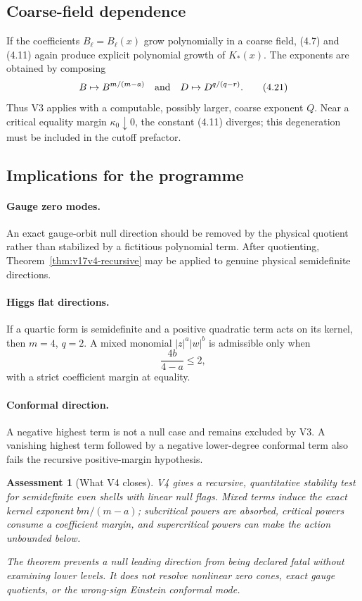 \documentclass[11pt]{article}
\newtheorem{assessment}[theorem]{Assessment}
\theoremstyle{remark}
\begin{document}
\subsection{Coarse-field dependence}

If the coefficients \(B_\ell=B_\ell(x)\) grow polynomially in a
coarse field, (4.7) and (4.11) again produce explicit polynomial
growth of \(K_*(x)\).  The exponents are obtained by composing
\[
 B\mapsto B^{m/(m-a)}
 \quad\hbox{and}\quad
 D\mapsto D^{q/(q-r)}.                              \tag{4.21}
\]
Thus V3 applies with a computable, possibly larger, coarse exponent
\(Q\).  Near a critical equality margin
\(\kappa_0\downarrow0\), the constant (4.11) diverges; this
degeneration must be included in the cutoff prefactor.

\subsection{Implications for the programme}

\paragraph{Gauge zero modes.}
An exact gauge-orbit null direction should be removed by the physical
quotient rather than stabilized by a fictitious polynomial term.
After quotienting, Theorem~\ref{thm:v17v4-recursive} may be applied
to genuine physical semidefinite directions.

\paragraph{Higgs flat directions.}
If a quartic form is semidefinite and a positive quadratic term acts
on its kernel, then \(m=4\), \(q=2\).  A mixed monomial
\(|z|^a|w|^b\) is admissible only when
\[
 \frac{4b}{4-a}\leq2,                               \tag{4.22}
\]
with a strict coefficient margin at equality.

\paragraph{Conformal direction.}
A negative highest term is not a null case and remains excluded by
V3.  A vanishing highest term followed by a negative lower-degree
conformal term also fails the recursive positive-margin hypothesis.

\begin{assessment}[What V4 closes]
\label{ass:v17v4-status}
V4 gives a recursive, quantitative stability test for semidefinite
even shells with linear null flags.  Mixed terms induce the exact
kernel exponent \(bm/(m-a)\); subcritical powers are absorbed,
critical powers consume a coefficient margin, and supercritical
powers can make the action unbounded below.

The theorem prevents a null leading direction from being declared
fatal without examining lower levels.  It does not resolve nonlinear
zero cones, exact gauge quotients, or the wrong-sign Einstein
conformal mode.
\end{assessment}
\end{document}
